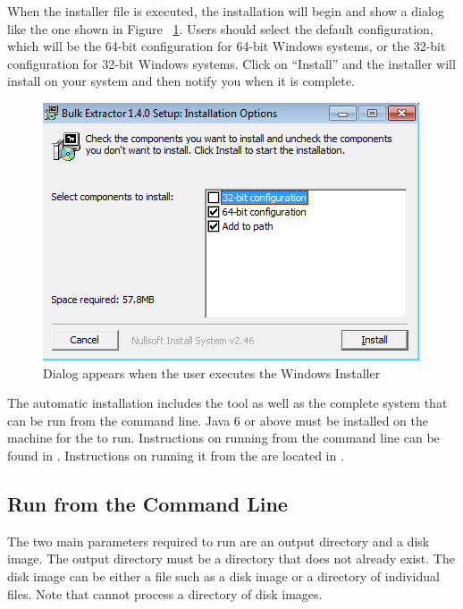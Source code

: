 \documentclass[11pt]{article} %
\begin{document}
When the installer file is executed, the installation will begin and show a dialog like the one shown in Figure ~\ref{fig:installer1}.  Users should select the default configuration, which will be the 64-bit configuration for 64-bit Windows systems, or the 32-bit configuration for 32-bit Windows systems.  Click on ``Install'' and the installer will install \bulk on your system and then notify you when it is complete.\\
\begin{figure}
	\center
	\includegraphics[scale=.70]{installPics/installer1.png}
	\caption{Dialog appears when the user executes the Windows Installer}
	\label{fig:installer1}
\end{figure}


The automatic installation includes the \viewer tool as well as the complete \bulk system that can be run from the command line. Java 6 or above must  be installed on the machine for the \viewer to run. Instructions on running \bulk from the command line can be found in  \textbf{}. Instructions on running it from the \viewer are located in \textbf{}. \\

\subsection {Run \bulk from the Command Line}
\label{RunFromCommandLine}
The two main parameters required to run \bulk are an output directory and a disk image. The output directory must be a directory that does not already exist. The disk image can be either a file such as a disk image or a directory of individual files. Note that \bulk cannot process a directory of disk images.\\
\end{document}
